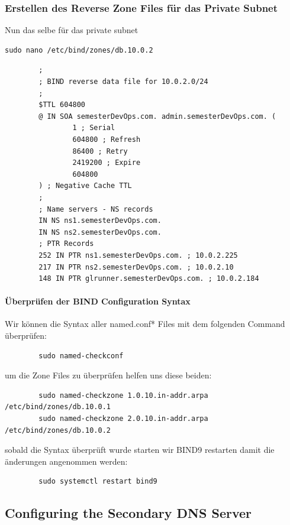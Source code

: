 \documentclass[a4paper,12pt]{article}
\begin{document}
\newpage

\subsubsection{Erstellen des Reverse Zone Files für das Private Subnet}
Nun das selbe für das private subnet

\begin{verbatim}
sudo nano /etc/bind/zones/db.10.0.2
\end{verbatim}

\begin{verbatim}
		;
		; BIND reverse data file for 10.0.2.0/24
		;
		$TTL 604800
		@ IN SOA semesterDevOps.com. admin.semesterDevOps.com. (
				1 ; Serial 
				604800 ; Refresh
				86400 ; Retry
				2419200 ; Expire
				604800 
		) ; Negative Cache TTL
		;
		; Name servers - NS records
		IN NS ns1.semesterDevOps.com.
		IN NS ns2.semesterDevOps.com.
		; PTR Records
		252 IN PTR ns1.semesterDevOps.com. ; 10.0.2.225
		217 IN PTR ns2.semesterDevOps.com. ; 10.0.2.10
		148 IN PTR glrunner.semesterDevOps.com. ; 10.0.2.184
\end{verbatim}

\paragraph{Überprüfen der BIND Configuration Syntax}
Wir können die Syntax aller named.conf* Files mit dem folgenden Command überprüfen:

\begin{verbatim}
		sudo named-checkconf
\end{verbatim}
um die Zone Files zu überprüfen helfen uns diese beiden:
\begin{verbatim}
		sudo named-checkzone 1.0.10.in-addr.arpa /etc/bind/zones/db.10.0.1
		sudo named-checkzone 2.0.10.in-addr.arpa /etc/bind/zones/db.10.0.2
\end{verbatim}
sobald die Syntax überprüft wurde starten wir BIND9 restarten damit die änderungen angenommen werden:
\begin{verbatim}
		sudo systemctl restart bind9
\end{verbatim}

\subsection{Configuring the Secondary DNS Server}
\end{document}

